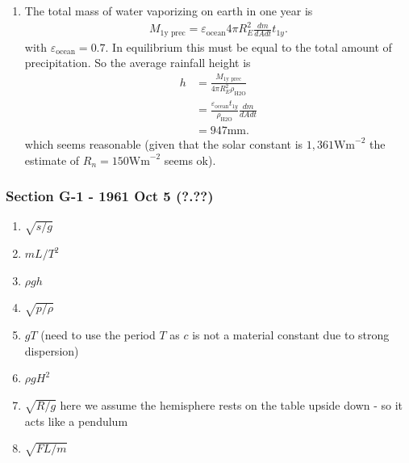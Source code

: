 \documentclass[10pt,a4paper]{article}
\theoremstyle{definition}
\begin{document}
\begin{enumerate}[label=(\alph*)]
\item The total mass of water vaporizing on earth in one year is
\begin{align}
    M_\text{1y prec}=\varepsilon_\text{ocean} 4\pi R_E^2  \frac{dm}{dA dt} t_{1y}.
\end{align}
with $\varepsilon_\text{ocean}=0.7$. In equilibrium this must be equal to the total amount of precipitation. So the average rainfall height is 
\begin{align}
    h&=\frac{M_\text{1y prec}}{4\pi R_E^2\rho_\text{H2O}}\\
    &=\frac{\varepsilon_\text{ocean}t_{1y}}{\rho_\text{H2O}} \frac{dm}{dA dt}\\
    &=947\text{mm}.
\end{align}
which seems reasonable (given that the solar constant is $1,361\text{Wm}^{-2}$ the estimate of $R_n=150\text{Wm}^{-2}$ seems ok).
\end{enumerate}

\subsubsection{Section G-1 - 1961 Oct 5 (?.??)}
\begin{enumerate}[label=(\alph*)]
    \item $\sqrt{s/g}$
    \item $mL/T^2$
    \item $\rho g h$
    \item $\sqrt{p/\rho}$
    \item $gT$ (need to use the period $T$ as $c$ is not a material constant due to strong dispersion)
    \item $\rho g H^2$
    \item $\sqrt{R/g}$ here we assume the hemisphere rests on the table upside down - so it acts like a pendulum 
    \item $\sqrt{FL/m}$
\end{enumerate}
\end{document}
